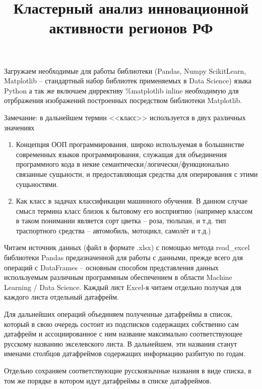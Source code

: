 \documentclass[11pt]{article}
\title{Кластерный анализ инновационной активности регионов РФ}
\date{\vspace{-5ex}}
\begin{document}
    
    
    \maketitle
    
    \newpage
    
    
    
    Загружаем необходимые для работы библиотеки (Pandas, Numpy ScikitLearn,
Matplotlib -- стандартный набор библиотек применяемых в Data Science)
языка Python а так же включаем диррективу \%matplotlib inline
необходимую для отрбражения изображений построенных посредством
библиотеки Matplotlib.


    Замечание: в дальнейшем термин <<класс>> используется в двух
различных значениях

\begin{enumerate}
\item Концепция ООП программирования, широко используемая в большинстве современных языков программирования, служащая для объединения программного кода в некие семантически/логически/функционально связанные сущьности, и предоставляющая средства для оперирования с этими сущьностями.
\item Как класс в задачах классификации машинного обучения. В данном случае смысл термина класс близок к бытовому его восприятию (например классом в таком понимании является сорт цветка -- роза, тюльпан, и т.д. тип траспортного средства -- автомобиль, мотоцикл, самолёт и т.д.)
\end{enumerate}

Читаем источник данных (файл в формате .xlsx) с помощью метода
read\_excel библиотеки Pandas предазначенной для работы с данными,
прежде всего для операций с DataFrames -- основным способом представления
данных используемым различным программным обеспечением в области Machine
Learning / Data Science. Каждый лист Excel-я читаем отдельно получая для
каждого листа отдельный датафрейм.


    Для дальнейших операций объединяем полученные датафреймы в список,
который в свою очередь состоит из подсписков содержащих собственно сам
датафрейм и ассоциированное с ним название максимально соответствующее
русскому названию экселевского листа. В дальнейшем, эти названия станут
именами столбцов датафреймов содержащих информацию разбитую по годам.


    Отдельно сохраняем соответствующие русскоязычные названия в виде списка,
в том же порядке в котором идут датафреймы в списке датафреймов.
\end{document}
